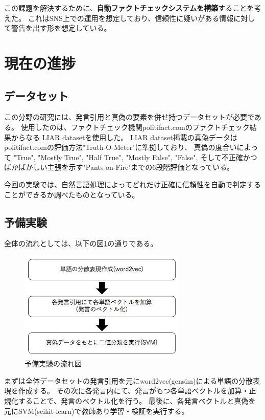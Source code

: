 \documentclass[twocolumn, a4paper, uplatex]{UECIEresume}
\begin{document}
この課題を解決するために、\textbf{自動ファクトチェックシステムを構築}することを考えた。
これはSNS上での運用を想定しており、信頼性に疑いがある情報に対して警告を出す形を想定している。

\section{現在の進捗}
\subsection{データセット}
この分野の研究には、発言引用と真偽の要素を併せ持つデータセットが必要である。
使用したのは、ファクトチェック機関politifact.comのファクトチェック結果からなる
LIAR datasetを使用した\cite{pants}。
LIAR dataset掲載の真偽データはpolitifact.comの評価方法"Truth-O-Meter"に準拠\cite{pants}しており、
真偽の度合いによって
"True", "Mostly True", "Half True", "Mostly False", "False",
そして不正確かつばかばかしい主張を示す"Pants-on-Fire"までの6段階評価となっている\cite{truth}。

今回の実験では、自然言語処理によってどれだけ正確に信頼性を自動で判定することができるか調べたものとなっている。

\subsection{予備実験}
全体の流れとしては、以下の図\ref{fig:nagare}の通りである。

\begin{figure}[h]
  \begin{center}
    \includegraphics[width=8cm]{fig1.jpg}
    \caption{予備実験の流れ図}
    \label{fig:nagare}
  \end{center}
\end{figure}

まずは全体データセットの発言引用を元にword2vec(gensim)による単語の分散表現を作成する。
その次に各発言内にて、発言がもつ各単語ベクトルを加算・正規化することで、発言のベクトル化を行う。
最後に、各発言ベクトルと真偽を元にSVM(scikit-learn)で教師あり学習・検証を実行する。
\end{document}
